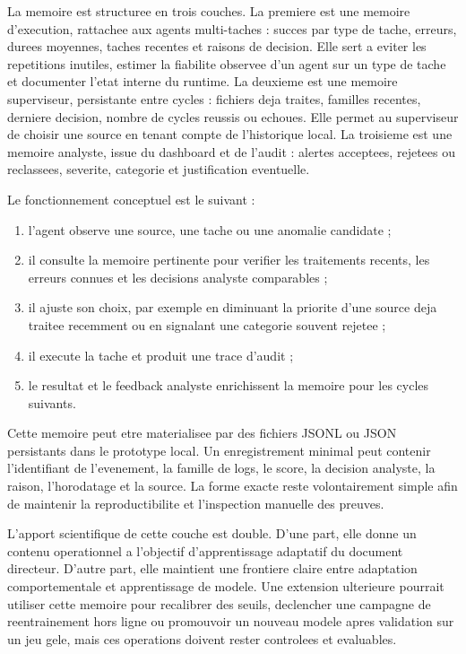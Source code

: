 La memoire est structuree en trois couches. La premiere est une memoire d'execution, rattachee aux agents multi-taches : succes par type de tache, erreurs, durees moyennes, taches recentes et raisons de decision. Elle sert a eviter les repetitions inutiles, estimer la fiabilite observee d'un agent sur un type de tache et documenter l'etat interne du runtime. La deuxieme est une memoire superviseur, persistante entre cycles : fichiers deja traites, familles recentes, derniere decision, nombre de cycles reussis ou echoues. Elle permet au superviseur de choisir une source en tenant compte de l'historique local. La troisieme est une memoire analyste, issue du dashboard et de l'audit : alertes acceptees, rejetees ou reclassees, severite, categorie et justification eventuelle.

Le fonctionnement conceptuel est le suivant :

\begin{enumerate}
  \item l'agent observe une source, une tache ou une anomalie candidate ;
  \item il consulte la memoire pertinente pour verifier les traitements recents, les erreurs connues et les decisions analyste comparables ;
  \item il ajuste son choix, par exemple en diminuant la priorite d'une source deja traitee recemment ou en signalant une categorie souvent rejetee ;
  \item il execute la tache et produit une trace d'audit ;
  \item le resultat et le feedback analyste enrichissent la memoire pour les cycles suivants.
\end{enumerate}

Cette memoire peut etre materialisee par des fichiers JSONL ou JSON persistants dans le prototype local. Un enregistrement minimal peut contenir l'identifiant de l'evenement, la famille de logs, le score, la decision analyste, la raison, l'horodatage et la source. La forme exacte reste volontairement simple afin de maintenir la reproductibilite et l'inspection manuelle des preuves.

L'apport scientifique de cette couche est double. D'une part, elle donne un contenu operationnel a l'objectif d'apprentissage adaptatif du document directeur. D'autre part, elle maintient une frontiere claire entre adaptation comportementale et apprentissage de modele. Une extension ulterieure pourrait utiliser cette memoire pour recalibrer des seuils, declencher une campagne de reentrainement hors ligne ou promouvoir un nouveau modele apres validation sur un jeu gele, mais ces operations doivent rester controlees et evaluables.

